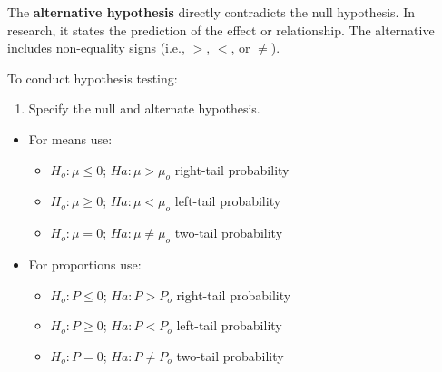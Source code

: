 \documentclass[
  letterpaper,
  DIV=11,
  numbers=noendperiod]{scrreprt}
\providecommand{\tightlist}{%
  \setlength{\itemsep}{0pt}\setlength{\parskip}{0pt}}\usepackage{longtable,booktabs,array}
\begin{document}
The \textbf{alternative hypothesis} directly contradicts the null
hypothesis. In research, it states the prediction of the effect or
relationship. The alternative includes non-equality signs (i.e., \(>\),
\(<\), or \(\ne\)).

To conduct hypothesis testing:

\begin{enumerate}
\def\labelenumi{\arabic{enumi}.}
\tightlist
\item
  Specify the null and alternate hypothesis.
\end{enumerate}

\begin{itemize}
\item
  For means use:

  \begin{itemize}
  \item
    \(H_o: \mu \leq 0\); \(Ha: \mu > \mu_o\) right-tail probability
  \item
    \(H_o: \mu \geq 0\); \(Ha: \mu < \mu_o\) left-tail probability
  \item
    \(H_o: \mu = 0\); \(Ha: \mu \ne \mu_o\) two-tail probability
  \end{itemize}
\item
  For proportions use:

  \begin{itemize}
  \item
    \(H_o: P \leq 0\); \(Ha: P > P_o\) right-tail probability
  \item
    \(H_o: P \geq 0\); \(Ha: P < P_o\) left-tail probability
  \item
    \(H_o: P = 0\); \(Ha: P \ne P_o\) two-tail probability
  \end{itemize}
\end{itemize}
\end{document}
